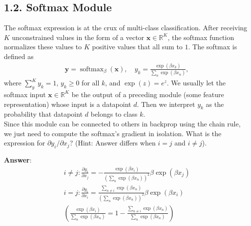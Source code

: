 \documentclass[12pt,letterpaper]{article}
\newcommand{\vect}[1]{\bm{#1}}     %
\DeclareMathOperator{\softmax}{softmax}
\begin{document}
\subsection*{1.2. Softmax Module}
The softmax expression is at the crux of multi-class classification.
After receiving $K$ unconstrained values in the form of a vector $\vect{x} \in \mathbb{R}^K$, the softmax function normalizes these values to $K$ positive values that all sum to $1$. The softmax is defined as
\begin{align}
\vect{y}=\softmax_\beta(\vect{x}),
\quad 
 y_k = \frac{\exp(\beta x_k)}{\sum_{n} \exp(\beta x_{n})},
\end{align}
where $\sum_y^K y_k = 1$, $y_k \geq 0$ for all $k$, and $\exp(z)=e^z$. We usually let the softmax input $\vect{x} \in \mathbb{R}^K$ be the output of a preceding module (some feature representation) whose input is a datapoint $d$. Then we interpret $y_k$ as the probability that datapoint $d$ belongs to class $k$.\\

\noindent Since this module can be connected to others in backprop using the chain rule, we just need to compute the softmax's gradient in isolation. What is the expression for $\partial y_i / \partial x_j$?
(Hint: Answer differs when $i = j$ and $i \neq j$).

\textbf{Answer}:
\begin{align}
i \neq j: \frac{\partial y_i}{\partial x_j} = -\frac{\exp(\beta x_i)}{(\sum_{n} \exp(\beta x_{n}))^2}
\beta\exp(\beta x_j)\\
i = j: \frac{\partial y_i}{\partial x_i} = \frac{\sum_{n \neq i} \exp(\beta x_n)}{(\sum_{n} \exp(\beta x_{n}))^2}\beta\exp(\beta x_i)\\
(\frac{\exp(\beta x_i)}{\sum_{n} \exp(\beta x_{n})} = 1 - \frac{\sum_{n \neq i} \exp(\beta x_n)}
{\sum_{n} \exp(\beta x_n)})
\end{align}

\newpage
\end{document}
